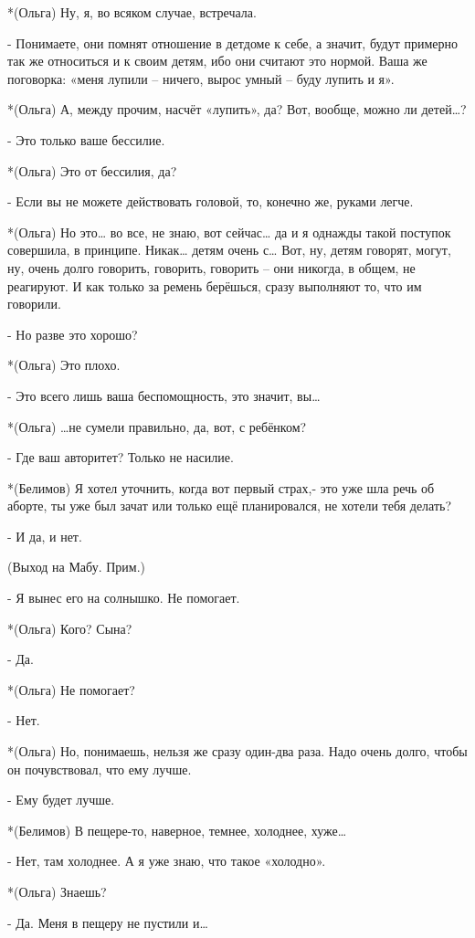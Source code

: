*(Ольга) Ну, я, во всяком случае, встречала.

- Понимаете, они помнят отношение в детдоме к себе, а значит, будут примерно так же относиться и к своим детям, ибо они считают это нормой. Ваша же поговорка: «меня лупили – ничего, вырос умный – буду лупить и я».

*(Ольга) А, между прочим, насчёт «лупить», да? Вот, вообще, можно ли детей…?

- Это только ваше бессилие.

*(Ольга) Это от бессилия, да?

- Если вы не можете действовать головой, то, конечно же, руками легче.

*(Ольга) Но это… во все, не знаю, вот сейчас… да и я однажды такой поступок совершила, в принципе. Никак… детям очень с… Вот, ну, детям говорят, могут, ну, очень долго говорить, говорить, говорить – они никогда, в общем, не реагируют. И как только за ремень берёшься, сразу выполняют то, что им говорили.

- Но разве это хорошо?

*(Ольга) Это плохо.

- Это всего лишь ваша беспомощность, это значит, вы…

*(Ольга) …не сумели правильно, да, вот, с ребёнком?

- Где ваш авторитет? Только не насилие.

*(Белимов) Я хотел уточнить, когда вот первый страх,- это уже шла речь об аборте, ты уже был зачат или только ещё планировался, не хотели тебя делать?

- И да, и нет.

(Выход на Мабу. Прим.)

- Я вынес его на солнышко. Не помогает.

*(Ольга) Кого? Сына?

- Да.

*(Ольга) Не помогает?

- Нет.

*(Ольга) Но, понимаешь, нельзя же сразу один-два раза. Надо очень долго, чтобы он почувствовал, что ему лучше.

- Ему будет лучше.

*(Белимов) В пещере-то, наверное, темнее, холоднее, хуже…

- Нет, там холоднее. А я уже знаю, что такое «холодно».

*(Ольга) Знаешь?

- Да. Меня в пещеру не пустили и…

